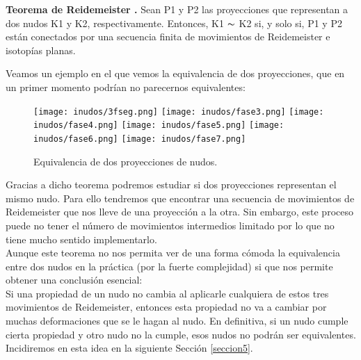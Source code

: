 \begin{teo} \textbf{Teorema de Reidemeister \cite{5}.} Sean P1 y P2 las proyecciones que representan a dos nudos K1 y K2, respectivamente. Entonces, K1 $\thicksim$ K2 si, y solo si, P1 y P2 están conectados por una secuencia finita de movimientos de Reidemeister e isotopías planas.
\end{teo}

Veamos un ejemplo en el que vemos la equivalencia de dos proyecciones, que en un primer momento podrían no parecernos equivalentes:
  \begin{figure}[h!]
  	\texttt{[image: inudos/3fseg.png]}
  	\texttt{[image: inudos/fase3.png]}
  	\texttt{[image: inudos/fase4.png]}
  	\texttt{[image: inudos/fase5.png]}
  	\texttt{[image: inudos/fase6.png]}
  	\texttt{[image: inudos/fase7.png]}
  	\centering
  	\caption{Equivalencia de dos proyecciones de nudos.}
  	\label{algosj} 
  \end{figure}

Gracias a dicho teorema podremos estudiar si dos proyecciones representan el mismo nudo. Para ello tendremos que encontrar una secuencia de movimientos de Reidemeister que nos lleve de una proyección a la otra. Sin embargo, este proceso puede no tener el número de movimientos intermedios limitado por lo que no tiene mucho sentido implementarlo.\\
 
 Aunque este teorema no nos permita ver de una forma cómoda la equivalencia entre dos nudos en la práctica (por la fuerte complejidad) si que nos permite obtener una conclusión esencial:\\
 
 Si una propiedad de un nudo no cambia al aplicarle cualquiera de estos tres movimientos de Reidemeister, entonces esta propiedad no va a cambiar por muchas deformaciones que se le hagan al nudo. En definitiva, si un nudo cumple cierta propiedad y otro nudo no la cumple, esos nudos no podrán ser equivalentes. Incidiremos en esta idea en la siguiente Sección \ref{seccion5}.
 